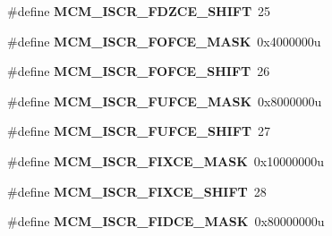 \begin{DoxyCompactItemize}
\item 
\#define {\bfseries M\+C\+M\+\_\+\+I\+S\+C\+R\+\_\+\+F\+D\+Z\+C\+E\+\_\+\+S\+H\+I\+FT}~25\hypertarget{group__MCM__Register__Masks_ga12ce128ef5d64154df362b12c33aa526}{}\label{group__MCM__Register__Masks_ga12ce128ef5d64154df362b12c33aa526}

\item 
\#define {\bfseries M\+C\+M\+\_\+\+I\+S\+C\+R\+\_\+\+F\+O\+F\+C\+E\+\_\+\+M\+A\+SK}~0x4000000u\hypertarget{group__MCM__Register__Masks_ga7c59e8eefce78e605951ecf8c9da1f00}{}\label{group__MCM__Register__Masks_ga7c59e8eefce78e605951ecf8c9da1f00}

\item 
\#define {\bfseries M\+C\+M\+\_\+\+I\+S\+C\+R\+\_\+\+F\+O\+F\+C\+E\+\_\+\+S\+H\+I\+FT}~26\hypertarget{group__MCM__Register__Masks_gab83f7a7d4986544ad6d5a3972d72ced3}{}\label{group__MCM__Register__Masks_gab83f7a7d4986544ad6d5a3972d72ced3}

\item 
\#define {\bfseries M\+C\+M\+\_\+\+I\+S\+C\+R\+\_\+\+F\+U\+F\+C\+E\+\_\+\+M\+A\+SK}~0x8000000u\hypertarget{group__MCM__Register__Masks_ga9fa9ddc6391e5958245ccd332ebcd575}{}\label{group__MCM__Register__Masks_ga9fa9ddc6391e5958245ccd332ebcd575}

\item 
\#define {\bfseries M\+C\+M\+\_\+\+I\+S\+C\+R\+\_\+\+F\+U\+F\+C\+E\+\_\+\+S\+H\+I\+FT}~27\hypertarget{group__MCM__Register__Masks_gaeeab14ab4de1fa7d2d9a5d2492730e74}{}\label{group__MCM__Register__Masks_gaeeab14ab4de1fa7d2d9a5d2492730e74}

\item 
\#define {\bfseries M\+C\+M\+\_\+\+I\+S\+C\+R\+\_\+\+F\+I\+X\+C\+E\+\_\+\+M\+A\+SK}~0x10000000u\hypertarget{group__MCM__Register__Masks_gad92657cd1980c03f0d15615a3c9f2989}{}\label{group__MCM__Register__Masks_gad92657cd1980c03f0d15615a3c9f2989}

\item 
\#define {\bfseries M\+C\+M\+\_\+\+I\+S\+C\+R\+\_\+\+F\+I\+X\+C\+E\+\_\+\+S\+H\+I\+FT}~28\hypertarget{group__MCM__Register__Masks_gab9757207c9768c3f13461873bcb78d71}{}\label{group__MCM__Register__Masks_gab9757207c9768c3f13461873bcb78d71}

\item 
\#define {\bfseries M\+C\+M\+\_\+\+I\+S\+C\+R\+\_\+\+F\+I\+D\+C\+E\+\_\+\+M\+A\+SK}~0x80000000u\hypertarget{group__MCM__Register__Masks_ga0dc0741a93b687a65f28c5a1e109ba6e}{}\label{group__MCM__Register__Masks_ga0dc0741a93b687a65f28c5a1e109ba6e}


\end{DoxyCompactItemize}
